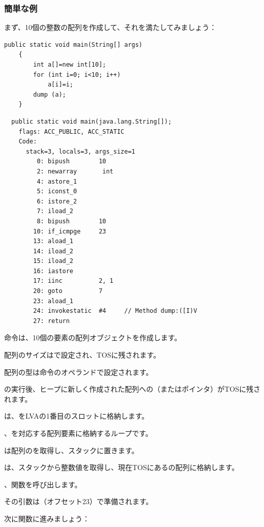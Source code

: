 \subsubsection{簡単な例}

まず、10個の整数の配列を作成して、それを満たしてみましょう：

\begin{lstlisting}[style=customjava]
	public static void main(String[] args) 
	{
		int a[]=new int[10];
		for (int i=0; i<10; i++)
			a[i]=i;
		dump (a);
	}
\end{lstlisting}

\begin{lstlisting}
  public static void main(java.lang.String[]);
    flags: ACC_PUBLIC, ACC_STATIC
    Code:
      stack=3, locals=3, args_size=1
         0: bipush        10
         2: newarray       int
         4: astore_1      
         5: iconst_0      
         6: istore_2      
         7: iload_2       
         8: bipush        10
        10: if_icmpge     23
        13: aload_1       
        14: iload_2       
        15: iload_2       
        16: iastore       
        17: iinc          2, 1
        20: goto          7
        23: aload_1       
        24: invokestatic  #4     // Method dump:([I)V
        27: return        
\end{lstlisting}

命令は、10個の要素の配列オブジェクトを作成します。

配列のサイズはで設定され、\ac{TOS}に残されます。

配列の型は命令のオペランドで設定されます。

の実行後、ヒープに新しく作成された配列への（またはポインタ）が\ac{TOS}に残されます。

は、を\ac{LVA}の1番目のスロットに格納します。

、を対応する配列要素に格納するループです。

は配列のを取得し、スタックに置きます。

は、スタックから整数値を取得し、現在\ac{TOS}にあるの配列に格納します。

、関数を呼び出します。

その引数は（オフセット23）で準備されます。

次に関数に進みましょう：

